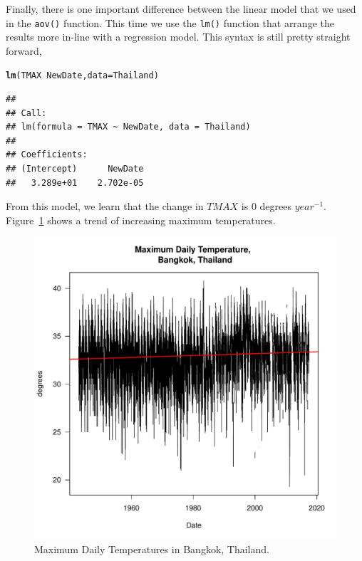 \documentclass{article}\usepackage[]{graphicx}\usepackage[]{color}
\makeatletter
\def\maxwidth{ %
  \ifdim\Gin@nat@width>\linewidth
    \linewidth
  \else
    \Gin@nat@width
  \fi
}
\newcommand{\hlopt}[1]{\textcolor[rgb]{0,0,0}{#1}}%
\newcommand{\hlstd}[1]{\textcolor[rgb]{0.345,0.345,0.345}{#1}}%
\newcommand{\hlkwc}[1]{\textcolor[rgb]{0.333,0.667,0.333}{#1}}%
\newcommand{\hlkwd}[1]{\textcolor[rgb]{0.737,0.353,0.396}{\textbf{#1}}}%
\newenvironment{kframe}{%
 \def\at@end@of@kframe{}%
 \ifinner\ifhmode%
  \def\at@end@of@kframe{\end{minipage}}%
  \begin{minipage}{\columnwidth}%
 \fi\fi%
 \def\FrameCommand##1{\hskip\@totalleftmargin \hskip-\fboxsep
 \colorbox{shadecolor}{##1}\hskip-\fboxsep
     \hskip-\linewidth \hskip-\@totalleftmargin \hskip\columnwidth}%
 \MakeFramed {\advance\hsize-\width
   \@totalleftmargin\z@ \linewidth\hsize
   \@setminipage}}%
 {\par\unskip\endMakeFramed%
 \at@end@of@kframe}
\newenvironment{knitrout}{}{} %
\makeatother
\begin{document}
Finally, there is one important difference between the linear model that we used in the \texttt{aov()} function. This time we use the \texttt{lm()} function that arrange the results more in-line with a regression model.
This syntax is still pretty straight forward,  

\begin{knitrout}
\color{fgcolor}\begin{kframe}
\begin{alltt}
\hlkwd{lm}\hlstd{(TMAX} \hlopt{~} \hlstd{NewDate,} \hlkwc{data}\hlstd{=Thailand)}
\end{alltt}
\begin{verbatim}
## 
## Call:
## lm(formula = TMAX ~ NewDate, data = Thailand)
## 
## Coefficients:
## (Intercept)      NewDate  
##   3.289e+01    2.702e-05
\end{verbatim}
\end{kframe}
\end{knitrout}

From this model, we learn that the change in $TMAX$ is 
0 degrees $year^{-1}$. Figure~\ref{fig:TMAX_trend} shows a trend of increasing maximum temperatures.

\begin{figure}
\label{fig:TMAX_trend}
\caption{Maximum Daily Temperatures in Bangkok, Thailand.}
\begin{knitrout}
\color{fgcolor}
\includegraphics[width=\maxwidth]{figure/unnamed-chunk-12-1} 

\end{knitrout}
\end{figure}
\end{document}
